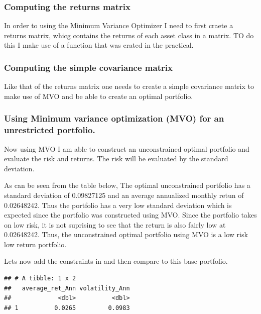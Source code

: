 \documentclass[11pt,preprint, authoryear]{elsarticle}
\numberwithin{equation}{section}
\numberwithin{figure}{section}
\numberwithin{table}{section}
\begin{document}
\hypertarget{computing-the-returns-matrix}{%
\subsubsection{Computing the returns
matrix}\label{computing-the-returns-matrix}}

In order to using the Minimum Variance Optimizer I need to first craete
a returns matrix, whicg contains the returns of each asset class in a
matrix. TO do this I make use of a function that was crated in the
practical.

\hypertarget{computing-the-simple-covariance-matrix}{%
\subsubsection{Computing the simple covariance
matrix}\label{computing-the-simple-covariance-matrix}}

Like that of the returns matrix one needs to create a simple covariance
matrix to make use of MVO and be able to create an optimal portfolio.

\hypertarget{using-minimum-variance-optimization-mvo-for-an-unrestricted-portfolio.}{%
\subsubsection{Using Minimum variance optimization (MVO) for an
unrestricted
portfolio.}\label{using-minimum-variance-optimization-mvo-for-an-unrestricted-portfolio.}}

Now using MVO I am able to construct an unconstrained optimal portfolio
and evaluate the risk and returns. The risk will be evaluated by the
standard deviation.

As can be seen from the table below, The optimal unconstrained portfolio
has a standard deviation of 0.09827125 and an average annualized monthly
retun of 0.02648242. Thus the portfolio has a very low standard
deviation which is expected since the portfolio was constructed using
MVO. Since the portfolio takes on low risk, it is not suprising to see
that the return is also fairly low at 0.02648242. Thus, the
unconstrained optimal portfolio using MVO is a low risk low return
portfolio.

Lets now add the constraints in and then compare to this base portfolio.

\begin{verbatim}
## # A tibble: 1 x 2
##   average_ret_Ann volatility_Ann
##             <dbl>          <dbl>
## 1          0.0265         0.0983
\end{verbatim}
\end{document}
